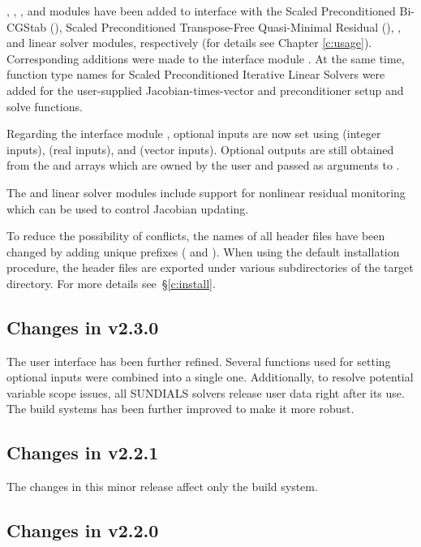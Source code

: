 {\kinspbcg}, {\kinsptfqmr}, {\kindense}, and {\kinband} modules have been
added to interface with the Scaled Preconditioned Bi-CGStab ({\spbcg}),
Scaled Preconditioned Transpose-Free Quasi-Minimal Residual ({\sptfqmr}),
{\dense}, and {\band} linear solver modules, respectively (for details
see Chapter \ref{c:usage}). Corresponding additions were made to the {\F}
interface module {\fkinsol}. At the same time, function type names for
Scaled Preconditioned Iterative Linear Solvers were added for the
user-supplied Jacobian-times-vector and preconditioner setup and solve
functions.

Regarding the {\F} interface module {\fkinsol}, optional inputs are now
set using  (integer inputs),  (real inputs),
and  (vector inputs). Optional outputs are still obtained
from the  and  arrays which are owned by the user
and passed as arguments to .

The {\kindense} and {\kinband} linear solver modules include support for
nonlinear residual monitoring which can be used to control Jacobian
updating.

To reduce the possibility of conflicts, the names of all header files have
been changed by adding unique prefixes ( and ).
When using the default installation procedure, the header files are exported
under various subdirectories of the target  directory. For more
details see~\S\ref{c:install}.

\subsection*{Changes in v2.3.0}

The user interface has been further refined. Several functions used for setting optional
inputs were combined into a single one. Additionally, to resolve potential variable scope
issues, all SUNDIALS solvers release user data right after its use. The build systems has 
been further improved to make it more robust.

\subsection*{Changes in v2.2.1}

The changes in this minor {\sundials} release affect only the build system.

\subsection*{Changes in v2.2.0}

